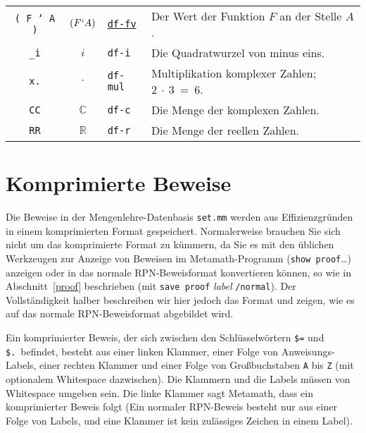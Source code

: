 {\begin{longtabu}   { @{} c c l X }
\texttt{( F ` A )} & $ ( F ` A ) $ &
\hyperref[df-fv]{\texttt{df-fv}} &
Der Wert der Funktion $F$ an der Stelle $A$. \\
\texttt{\_i} & $ i $ &
\texttt{df-i} &
Die Quadratwurzel von minus eins. \\
\texttt{x.} & $ \cdot $ &
\texttt{df-mul} &
Multiplikation komplexer Zahlen; $2~\cdot~3~=~6$. \\
\texttt{CC} & $ \mathbb{C} $ &
\texttt{df-c} &
Die Menge der komplexen Zahlen. \\
\texttt{RR} & $ \mathbb{R} $ &
\texttt{df-r} &
Die Menge der reellen Zahlen. \\
\end{longtabu}
} %

\chapter{Komprimierte Beweise}
\label{compressed}

Die Beweise in der Mengenlehre-Datenbasis \texttt{set.mm} werden aus Effizienzgründen in einem komprimierten Format gespeichert.  Normalerweise brau\-chen Sie sich nicht um das komprimierte Format zu kümmern, da Sie es mit den üblichen Werkzeugen zur Anzeige von Beweisen im Metamath-Programm (\texttt{show proof}\ldots) anzeigen oder in das normale RPN-Beweisformat konvertieren können, so wie in Abschnitt~\ref{proof} beschrieben (mit \texttt{save proof} {\em label} \texttt{/normal}).  Der Vollständigkeit halber beschreiben wir hier jedoch das Format und zeigen, wie es auf das normale RPN-Beweisformat abgebildet wird.

Ein komprimierter Beweis, der sich zwischen den Schlüsselwörtern \texttt{\$=} und \texttt{\$.}\ befindet, besteht aus einer linken Klammer, einer Folge von Anweisungs-Labels, einer rechten Klammer und einer Folge von Großbuchstaben \texttt{A} bis \texttt{Z} (mit optionalem Whitespace dazwischen).  Die Klammern und die Labels müssen von Whitespace umgeben sein.  Die linke Klammer sagt Metamath, dass ein komprimierter Beweis folgt (Ein normaler RPN-Beweis besteht nur aus einer Folge von Labels, und eine Klammer ist kein zulässiges Zeichen in einem Label).

